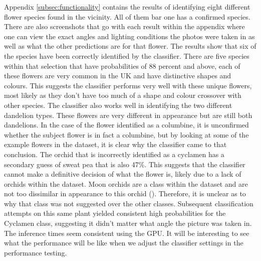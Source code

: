 \documentclass{article}
\begin{document}
Appendix \ref{subsec:functionality} contains the results of identifying eight different flower species found in the 
vicinity. All of them bar 
one has a confirmed species. There are also screenshots that go with each result within the appendix where one can view 
the exact angles and lighting conditions the photos were taken in as well as what the other predictions are for that 
flower. The results show that six of the species have been correctly identified by the classifier. There are five 
species within that selection that have probabilities of 88 percent and above, each of these flowers are very common in 
the UK and have distinctive shapes and colours. This suggests the classifier performs very well with these unique 
flowers, most likely as they don't have too much of a shape and colour crossover with other species. The classifier also
works well in identifying the two different dandelion types. These flowers are very different in appearance but are 
still both dandelions. In the case of the flower identified as a columbine, it is unconfirmed whether the subject 
flower is in fact a columbine, but by looking at some of the example flowers in the dataset, it is clear why the 
classifier came to that conclusion. The orchid that is incorrectly identified as a cyclamen has a secondary guess of 
sweat pea that is also 47\%. This suggests that the classifier cannot make a definitive decision of what the flower is,
likely due to a lack of orchids within the dataset. Moon orchids are a class within the dataset and are not too 
dissimilar in appearance to this orchid (\cite{PlantsState}). Therefore, it is unclear as to why that class was not 
suggested over the other classes. Subsequent classification attempts on this same plant yielded consistent high 
probabilities for the Cyclamen class, suggesting it didn't matter what angle the picture was taken in. The inference 
times seem consistent using the GPU. It will be interesting to see what the performance will be like when we adjust the 
classifier settings in the performance testing.
\end{document}

